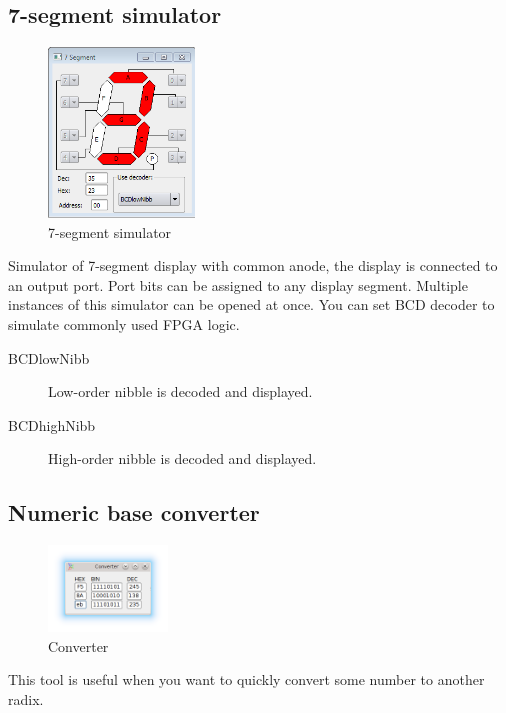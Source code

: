 \subsection{7-segment simulator}
    \begin{figure}
        \centering
        \includegraphics[width=110pt]{img/7seg_sim.png}
        \caption{7-segment simulator}
    \end{figure}
    Simulator of 7-segment display with common anode, the display is connected to an output port. Port bits can be
    assigned to any display segment. Multiple instances of this simulator can be opened at once. You can set BCD decoder
    to simulate commonly used FPGA logic.

    \begin{description}
        \item[BCDlowNibb] Low-order nibble is decoded and displayed.
        \item[BCDhighNibb] High-order nibble is decoded and displayed.
    \end{description}

\subsection{Numeric base converter}
    \begin{figure}
            \centering
            \includegraphics[width=90pt]{img/converter.png}
            \caption{Converter}
    \end{figure}
    This tool is useful when you want to quickly convert some number to another radix.
